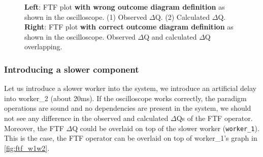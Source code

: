 \begin{figure}[H]
\begin{subfigure}{.5\textwidth}
                    \label{fig:good}%
                \end{subfigure}%
                \caption{\textbf{Left}: FTF plot \textbf{with wrong outcome diagram definition} as shown in the oscilloscope. (1) Observed $\Delta$Q. (2) Calculated $\Delta$Q. \\
                \textbf{Right}: FTF plot \textbf{with correct outcome diagram definition} as shown in the oscilloscope. Observed $\Delta$Q and calculated $\Delta$Q overlapping.}
                \label{fig:ftf_osc}%
            \end{figure}%
        \subsubsection{Introducing a slower component}
            Let us introduce a slower worker into the system, we introduce an artificial delay into worker\_2 (about 20ms). If the oscilloscope works correctly, the paradigm operations are sound and no dependencies are present in the system, we should not see any difference in the observed and calculated $\Delta$Qs of the FTF operator. Moreover, the FTF $\Delta$Q could be overlaid on top of the slower worker (\texttt{worker\_1}). This is the case, the FTF operator can be overlaid on top of worker\_1's graph in \cref{fig:ftf_w1w2}.

